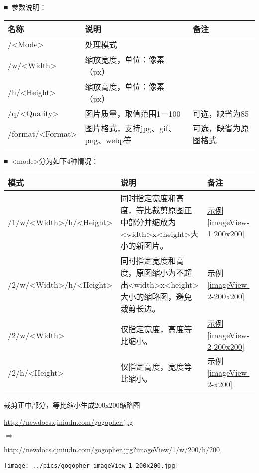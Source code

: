 \documentclass[11pt, oneside]{book}
\newcommand{\qsym}[1]{
\footnotesize
\noindent
#1\par
\normalsize
}
\newcommand{\qpara}[1]{
\vspace{0.3em}
\noindent
#1\par
\vspace{0.3em}
}
\newcommand{\qsamplelink}[1]{
\vspace{0.2em}
\noindent
#1\par
\vspace{0.1em}
}
\newcommand{\qurl}[1]{\footnotesize\url{#1}\normalsize}
\newcommand{\qtable}[1]{\footnotesize\vspace{0.5em}#1\vspace{0.5em}\normalsize}
\newcommand{\qsample}[1]{\hyperref[#1]{示例\ref*{#1}}}
\begin{document}
\qpara{■\ 参数说明：}
\qtable{
\def\arraystretch{2}
\begin{tabular}{|l|l|l|}
\hline
名称 & 说明 & 备注\\
\hline
/\textless Mode\textgreater & 处理模式 & \\
\hline
/w/\textless Width\textgreater & 缩放宽度，单位：像素（px） & \\
\hline
/h/\textless Height\textgreater & 缩放高度，单位：像素（px） & \\
\hline
/q/\textless Quality\textgreater & 图片质量，取值范围1－100 & 可选，缺省为85 \\
\hline
/format/\textless Format\textgreater & 图片格式，支持jpg、gif、png、webp等 & 可选，缺省为原图格式 \\
\hline
\end{tabular}
}

\qpara{■\ \textless mode\textgreater 分为如下4种情况：}
\qtable{
\def\arraystretch{2}
\begin{tabular}{|l|p{20em}|p{5em}|}
\hline
模式 & 说明 & 备注 \\
\hline
/1/w/\textless Width\textgreater /h/\textless Height\textgreater & 同时指定宽度和高度，等比裁剪原图正中部分并缩放为\textless width\textgreater x\textless height\textgreater 大小的新图片。& \qsample{imageView-1-200x200} \\
\hline
/2/w/\textless Width\textgreater /h/\textless Height\textgreater & 同时指定宽度和高度，原图缩小为不超出\textless width\textgreater x\textless height\textgreater 大小的缩略图，避免裁剪长边。& \qsample{imageView-2-200x200} \\
\hline
/2/w/\textless Width\textgreater & 仅指定宽度，高度等比缩小。 & \qsample{imageView-2-200x200} \\
\hline
/2/h/\textless Height\textgreater & 仅指定高度，宽度等比缩小。 & \qsample{imageView-2-x200} \\
\hline
\end{tabular}
}

\clearpage

\begin{sample}
  \caption{裁剪正中部分，等比缩小生成200x200缩略图}
    \qsamplelink{\qurl{http://newdocs.qiniudn.com/gogopher.jpg}}
    \qsym{$\Rightarrow$}
    \qsamplelink{\qurl{http://newdocs.qiniudn.com/gogopher.jpg?imageView/1/w/200/h/200}}

    \begin{center}
      \texttt{[image: ../pics/gogopher\_imageView\_1\_200x200.jpg]}
    \end{center}
  \label{imageView-1-200x200}
\end{sample}
\end{document}
